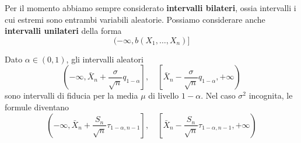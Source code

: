Per il momento abbiamo sempre considerato \textbf{intervalli bilateri}, ossia intervalli i cui
estremi sono entrambi variabili aleatorie. Possiamo considerare anche \textbf{intervalli unilateri}
della forma
\[ (-\infty, b(X_1, \dots, X_n)] \]

\begin{proposition}
	Dato $\alpha \in (0,1)$, gli intervalli aleatori
	\[
		\left( \left. -\infty, \bar{X}_n + \frac{\sigma}{\sqrt{n}} q_{1-\alpha} \right] \right.,
		\quad
		\left[ \bar{X}_n - \frac{\sigma}{\sqrt{n}} q_{1-\alpha}, +\infty \right)
	\]
	sono intervalli di fiducia per la media $\mu$ di livello $1-\alpha$. Nel caso $\sigma^2$
	incognita, le formule diventano
	\[
		\left( \left. -\infty, \bar{X}_n +
		\frac{S_n}{\sqrt{n}} \tau_{1-\alpha, n-1} \right] \right., \quad
		\left[ \left. \bar{X}_n - \frac{S_n}{\sqrt{n}}
		\tau_{1-\alpha, n-1}, +\infty \right) \right.
	\]
\end{proposition}